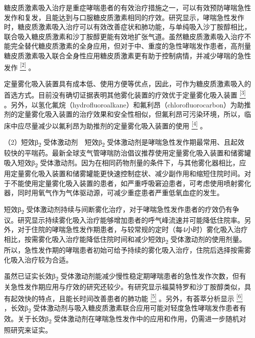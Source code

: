 糖皮质激素吸入治疗是重症哮喘患者的有效治疗措施之一，可以有效预防哮喘急性发作和复发，且能达到与口服糖皮质激素相同的疗效。研究显示，哮喘急性发作时，糖皮质激素吸入治疗可以有效改善症状和肺功能，与单纯吸入沙丁胺醇相比，联合吸入糖皮质激素和沙丁胺醇更能有效地扩张气道。虽然糖皮质激素吸入治疗不能完全替代糖皮质激素的全身应用，但对于中、重度的急性哮喘发作患者，高剂量糖皮质激素吸入联合全身性应用糖皮质激素更有助于控制病情，并减少哮喘的急性发作
\protect\hyperlink{text00013.htmlux5cux23ch2-12}{\textsuperscript{{[}2{]}}}
。

定量雾化吸入装置具有成本低、使用方便等优点，因此，可作为糖皮质激素吸入的首选方式。目前没有确切证据表明其他雾化装置的疗效优于定量雾化吸入装置
\protect\hyperlink{text00013.htmlux5cux23ch3-12}{\textsuperscript{{[}3{]}}}
。另外，以氢化氟烷（hydrofluoroalkane）和氟利昂（chlorofluorocarbon）为助推剂的定量雾化吸入装置的治疗效果和安全性相似，但氟利昂可污染环境，所以，临床中应尽量减少以氟利昂为助推剂的定量雾化吸入装置的使用
\protect\hyperlink{text00013.htmlux5cux23ch4-12}{\textsuperscript{{[}4{]}}}
。

（2）短效β\textsubscript{2} 受体激动剂　短效β\textsubscript{2}
受体激动剂是哮喘急性发作期最常用、且起效较快的平喘药。最新全球支气管哮喘防治倡议推荐使用定量雾化吸入装置和储雾罐吸入短效β\textsubscript{2}
受体激动剂。因为在相同药物剂量的条件下，与其他雾化器相比，应用定量雾化吸入装置和储雾罐能更快速控制症状、减少副作用和缩短住院时间。对于不能使用定量雾化吸入装置的患者，如严重呼吸窘迫患者，可考虑使用喷射雾化器，同时用氧气作为气体驱动源，可减少重症患者严重低氧血症的发生。

短效β\textsubscript{2}
受体激动剂持续与间断雾化治疗，对于哮喘急性发作患者的疗效仍有争议。研究显示持续雾化吸入治疗能够增加患者的呼气峰流速并可能降低住院率。另外，对于住院的哮喘急性发作期患者，与较常规的定时（每4小时）雾化吸入治疗相比，按需雾化吸入治疗能降低住院时间和减少短效β\textsubscript{2}
受体激动剂的使用剂量。所以，急性发作期的哮喘患者初始可给予持续的雾化吸入治疗，住院后选择按需雾化吸入治疗较为合适。

虽然已证实长效β\textsubscript{2}
受体激动剂能减少慢性稳定期哮喘患者的急性发作次数，但有关急性发作期应用与疗效的研究还较少。有研究显示福莫特罗和沙丁胺醇类似，具有起效快的特点，且能长时间改善患者的肺功能
\protect\hyperlink{text00013.htmlux5cux23ch5-12}{\textsuperscript{{[}5{]}}}
。另外，有荟萃分析显示
\protect\hyperlink{text00013.htmlux5cux23ch6-12}{\textsuperscript{{[}6{]}}}
，长效β\textsubscript{2}
受体激动剂与吸入糖皮质激素联合应用可能对轻度急性哮喘发作患者有效。关于长效β\textsubscript{2}
受体激动剂在哮喘急性发作中的应用和作用，仍需进一步随机对照研究来证实。

